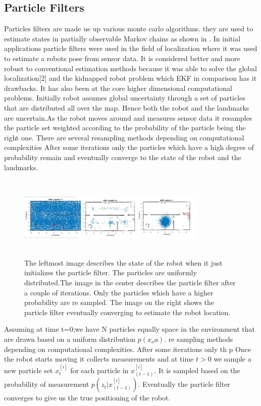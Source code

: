 \documentclass[conference]{IEEEtran}
\begin{document}
\subsection{Particle Filters}      %
Particles filters are made ue up various monte carlo algorithms. they are used to estimate states in partially observable Markov chains as shown in \cite{Doucet2001}. In  initial applications particle filters were used in the field of localization where it was used to estimate a robots pose from sensor data. It is considered better and more robust to conventional estimation methods because it was able to solve the global localization[2] and the kidnapped robot problem\cite{Engelson1992} which EKF in comparison has it drawbacks. It has also been at the core higher dimensional computational problems.  
Initially robot assumes global uncertainty through a set of particles that are distributed all over the map. Hence both the robot and the landmarks are uncertain.As the robot moves around and measures sensor data it resamples the particle set weighted according to the probability of the particle being the right one. There are several resampling methods depending on computational complexities \cite{Li2015} After some iterations only the particles which have a high degree of probability  remain and eventually converge to the state of the robot and the landmarks.
\begin{figure}[h!]
	\centering
	\includegraphics[height=40mm,width=90mm]{Particle_filter_method.JPG}
	\caption{The leftmost image describes the state of the robot when it just initializes the particle filter. The particles are uniformly distributed.The image in the center describes the particle filter after a couple of iterations. Only the particles which have a higher probability are re sampled. The image on the right shows the particle filter eventually converging to estimate the robot location. }
	
\end{figure}
Assuming at time t=0;we have N particles equally space in the environment that are drawn based on a uniform distribution $ p(x_oa)$.                                                                        re sampling methods depending on computational complexities. After some iterations only th   p
Once the robot starts moving it collects measurements and at time $t>0$ we sample a new particle set $x^{[i]}_t$ for each particle in $x^{[i]}_{(t-1)}$. It is sampled based on the probability of measurement $p(z_t|x^{[i]}_{(t-1)})$. Eventually the particle filter converges to give us the true positioning of the robot.
\end{document}
